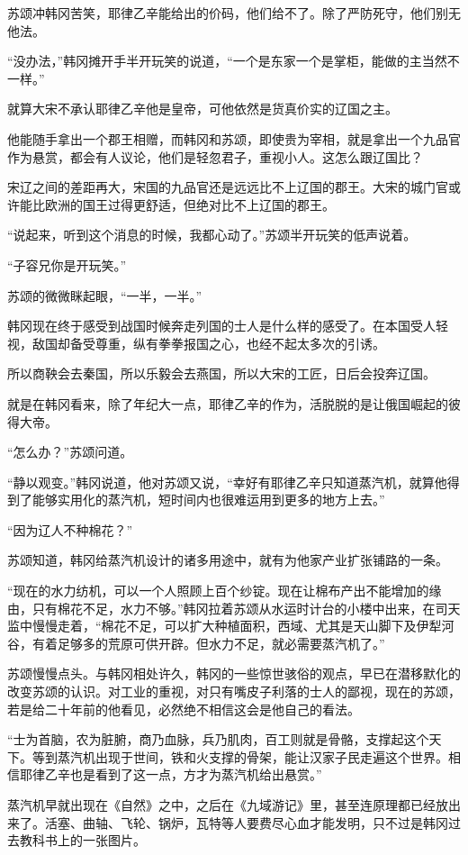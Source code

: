 苏颂冲韩冈苦笑，耶律乙辛能给出的价码，他们给不了。除了严防死守，他们别无他法。

“没办法，”韩冈摊开手半开玩笑的说道，“一个是东家一个是掌柜，能做的主当然不一样。”

就算大宋不承认耶律乙辛他是皇帝，可他依然是货真价实的辽国之主。

他能随手拿出一个郡王相赠，而韩冈和苏颂，即使贵为宰相，就是拿出一个九品官作为悬赏，都会有人议论，他们是轻忽君子，重视小人。这怎么跟辽国比？

宋辽之间的差距再大，宋国的九品官还是远远比不上辽国的郡王。大宋的城门官或许能比欧洲的国王过得更舒适，但绝对比不上辽国的郡王。

“说起来，听到这个消息的时候，我都心动了。”苏颂半开玩笑的低声说着。

“子容兄你是开玩笑。”

苏颂的微微眯起眼，“一半，一半。”

韩冈现在终于感受到战国时候奔走列国的士人是什么样的感受了。在本国受人轻视，敌国却备受尊重，纵有拳拳报国之心，也经不起太多次的引诱。

所以商鞅会去秦国，所以乐毅会去燕国，所以大宋的工匠，日后会投奔辽国。

就是在韩冈看来，除了年纪大一点，耶律乙辛的作为，活脱脱的是让俄国崛起的彼得大帝。

“怎么办？”苏颂问道。

“静以观变。”韩冈说道，他对苏颂又说，“幸好有耶律乙辛只知道蒸汽机，就算他得到了能够实用化的蒸汽机，短时间内也很难运用到更多的地方上去。”

“因为辽人不种棉花？”

苏颂知道，韩冈给蒸汽机设计的诸多用途中，就有为他家产业扩张铺路的一条。

“现在的水力纺机，可以一个人照顾上百个纱锭。现在让棉布产出不能增加的缘由，只有棉花不足，水力不够。”韩冈拉着苏颂从水运时计台的小楼中出来，在司天监中慢慢走着，“棉花不足，可以扩大种植面积，西域、尤其是天山脚下及伊犁河谷，有着足够多的荒原可供开辟。但水力不足，就必需要蒸汽机了。”

苏颂慢慢点头。与韩冈相处许久，韩冈的一些惊世骇俗的观点，早已在潜移默化的改变苏颂的认识。对工业的重视，对只有嘴皮子利落的士人的鄙视，现在的苏颂，若是给二十年前的他看见，必然绝不相信这会是他自己的看法。

“士为首脑，农为脏腑，商乃血脉，兵乃肌肉，百工则就是骨骼，支撑起这个天下。等到蒸汽机出现于世间，铁和火支撑的骨架，能让汉家子民走遍这个世界。相信耶律乙辛也是看到了这一点，方才为蒸汽机给出悬赏。”

蒸汽机早就出现在《自然》之中，之后在《九域游记》里，甚至连原理都已经放出来了。活塞、曲轴、飞轮、锅炉，瓦特等人要费尽心血才能发明，只不过是韩冈过去教科书上的一张图片。

